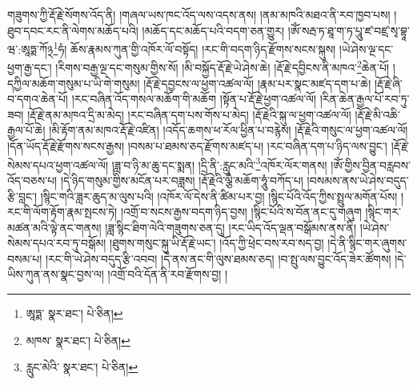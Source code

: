 གཟུགས་ཀྱི་རྡོ་རྗེ་སོགས་འོད་ནི། །གཞལ་ཡས་ཁང་འོད་ལས་འདས་ནས། །ནམ་མཁའི་མཐའ་ནི་རབ་ཁྱབ་པས། །ཐུབ་དབང་རང་ནི་ལེགས་མཆོད་པའི། །མཆོད་དང་མཆོད་པའི་བདག་ཅན་གྱུར། །ཨོཾ་སརྦ་ཏ་ཐཱ་ག་ཏ་པཱུ་ཛ་བཛྲ་སྭ་བྷཱ་ཝ་:ཨཱཏྨ་ཀོ྅\footnote{ཨཱཏྨ་  སྣར་ཐང་།  པེ་ཅིན། }ཧཾ། ཆོས་རྣམས་ཀུན་གྱི་འཁོར་ལོ་བསྟོད། །རང་གི་བདག་ཉིད་རྫོགས་སངས་སྐུས། །ཡེ་ཤེས་ལྔ་དང་ཕྱག་རྒྱ་དང་། །རིགས་བརྒྱ་ལྔ་དང་གསུམ་གྱིས་སོ། །མི་བསྐྱོད་རྡོ་རྗེ་ཡེ་ཤེས་ཆེ། །རྡོ་རྗེ་དབྱིངས་ནི་མཁའ་\footnote{མཁས་  སྣར་ཐང་།  པེ་ཅིན། }ཆེན་པོ། །དཀྱིལ་མཆོག་གསུམ་པ་ཡི་གེ་གསུམ། །རྡོ་རྗེ་དབྱངས་ལ་ཕྱག་འཚལ་ལོ། །རྣམ་པར་སྣང་མཛད་དག་པ་ཆེ། །རྡོ་རྗེ་ཞི་བ་དགའ་ཆེན་པོ། །རང་བཞིན་འོད་གསལ་མཆོག་གི་མཆོག །སྟོན་པ་རྡོ་རྗེ་ཕྱག་འཚལ་ལོ། །རིན་ཆེན་རྒྱལ་པོ་རབ་ཏུ་ཟབ། །རྡོ་རྗེ་ནམ་མཁའ་དྲི་མ་མེད། །རང་བཞིན་དག་པས་གོས་པ་མེད། །རྡོ་རྗེའི་སྐུ་ལ་ཕྱག་འཚལ་ལོ། །རྡོ་རྗེ་མི་འཆི་རྒྱལ་པོ་ཆེ། །མི་རྟོག་ནམ་མཁའ་རྡོ་རྗེ་འཛིན། །འདོད་ཆགས་ཕ་རོལ་ཕྱིན་པ་བརྙེས། །རྡོ་རྗེའི་གསུང་ལ་ཕྱག་འཚལ་ལོ། །དོན་ཡོད་རྡོ་རྗེ་རྫོགས་སངས་རྒྱས། །བསམ་པ་ཐམས་ཅད་རྫོགས་མཛད་པ། །རང་བཞིན་དག་པ་ཉིད་ལས་བྱུང་། །རྡོ་རྗེ་སེམས་དཔའ་ཕྱག་འཚལ་ལོ། །ཟླ་བ་ཉི་མ་ཆུ་དང་སྨན། །དྲི་ནི་:རླུང་མའི་\footnote{རླུང་མེའི་  སྣར་ཐང་།  པེ་ཅིན། }འཁོར་ལོར་གནས། །ཨོཾ་གྱིས་བྱིན་བརླབས་འོད་བཅས་པ། །དེ་ཉིད་གསུམ་གྱིས་མངོན་པར་བཟླས། །རྡོ་རྗེའི་ལྕེ་མཆོག་ཧཱུཾ་བཀོད་པ། །བསམས་ནས་ཡེ་ཤེས་བདུད་རྩི་བླང་། །སྙིང་གའི་ཟླར་ཆུད་མ་ལུས་པའི། །འཁོར་ལོ་དེས་ནི་ཚིམ་པར་བྱ། །སྙིང་པོའི་འོད་ཀྱིས་སྤྲུལ་མགོན་པོས། །རང་གི་ལོག་རྟོག་རྣམ་སྤངས་ཏེ། །འགྲོ་བ་སངས་རྒྱས་བདག་ཉིད་བྱས། །སྙིང་པོའི་ས་བོན་ནང་དུ་གཞུག །སྙིང་གར་མཚན་མའི་ལྟེ་ནང་གནས། །ཟླ་སྙིང་ཐིག་ལེའི་གཟུགས་ཅན་དུ། །རང་ཡིད་འོད་ལྡན་བསྒོམས་ནས་ནི། །ཡེ་ཤེས་སེམས་དཔའ་རབ་ཏུ་བསྒོམ། །ཐུགས་གསུང་སྐུ་ཡི་རྡོ་རྗེ་ཡང་། །འོད་ཀྱི་ཕྲེང་བས་རབ་སད་བྱ། །དེ་ནི་སྙིང་གར་ཞུགས་བསམ་པ། །རང་གི་ཡེ་ཤེས་བདུད་རྩི་འབབ། །དེ་ནས་ནང་གི་ལུས་ཐམས་ཅད། །བ་སྤུ་ལས་བྱུང་འོད་ཟེར་ཚོགས། །དེ་ཡིས་ཀུན་ནས་སྣང་བྱས་ལ། །འགྲོ་བའི་དོན་ནི་རབ་རྫོགས་བྱ། །
